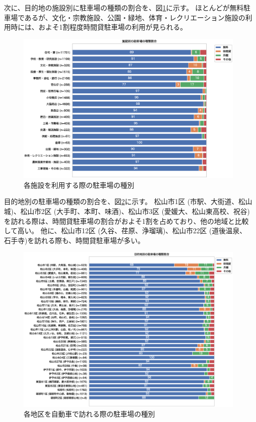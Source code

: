 \documentclass[a4paper,12pt, uplatex]{jsbook}
\begin{document}
\clearpage
次に、目的地の施設別に駐車場の種類の割合を、図\ref{fig:parking_share_facility}に示す。
ほとんどが無料駐車場であるが、文化・宗教施設、公園・緑地、体育・レクリエーション施設の利用時には、およそ1割程度時間貸駐車場の利用が見られる。
%
\begin{figure}[H]
    \centering
    \includegraphics[width=1.0\textwidth]{picture/parking_share_facility.eps}
    \caption{各施設を利用する際の駐車場の種別}
    \label{fig:parking_share_facility}
\end{figure}

\clearpage
目的地別の駐車場の種類の割合を、図\ref{fig:parking_share_zone}に示す。
松山市1区 (市駅、大街道、松山城)、松山市2区 (大手町、本町、味酒)、松山市3区 (愛媛大、松山東高校、祝谷)を訪れる際は、時間貸駐車場の割合がおよそ1割を占めており、他の地域と比較して高い。
他に、松山市12区 (久谷、荏原、浄瑠璃)、松山市22区 (道後温泉、石手寺)を訪れる際も、時間貸駐車場が多い。
%
\begin{figure}[H]
    \centering
    \includegraphics[width=1.0\textwidth]{picture/parking_share_zone.eps}
    \caption{各地区を自動車で訪れる際の駐車場の種別}
    \label{fig:parking_share_zone}
\end{figure}
\end{document}
